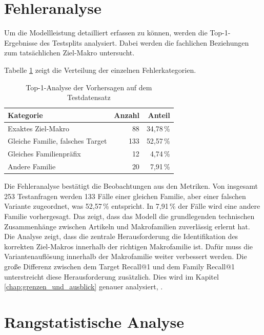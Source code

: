 \section{Fehleranalyse}

Um die Modellleistung detailliert erfassen zu können, werden die Top-1-Ergebnisse des Testsplits analysiert. Dabei werden die fachlichen Beziehungen zum tatsächlichen Ziel-Makro untersucht.

Tabelle \ref{tab:fehleranalyse_top1} zeigt die Verteilung der einzelnen Fehlerkategorien. 

\begin{table}[H] 
  \centering 
  \caption{Top-1-Analyse der Vorhersagen auf dem Testdatensatz} 
  \label{tab:fehleranalyse_top1} 
  \begin{tabular}{lrr} 
    \toprule 
    \textbf{Kategorie} & \textbf{Anzahl} & \textbf{Anteil} \\ 
    \midrule 
    Exaktes Ziel-Makro \parencite{EPLAN-Makros} & 88 & 34,78\,\% \\
    Gleiche Familie, falsches Target & 133 & 52,57\,\% \\
    Gleiches Familienpräfix & 12 & 4,74\,\% \\
    Andere Familie & 20 & 7,91\,\% \\
    \bottomrule 
  \end{tabular} 
\end{table}

Die Fehleranalyse bestätigt die Beobachtungen aus den Metriken. Von insgesamt 253 Testanfragen werden 133 Fälle einer gleichen Familie, aber einer falschen Variante zugeordnet, was 52,57\,\% entspricht.
In 7,91\,\% der Fälle wird eine andere Familie vorhergesagt. Das zeigt, dass das Modell die grundlegenden technischen Zusammenhänge zwischen Artikeln und Makrofamilien zuverlässig erlernt hat.
Die Analyse zeigt, dass die zentrale Herausforderung die Identifikation des korrekten Ziel-Makros \parencite{EPLAN-Makros} innerhalb der richtigen Makrofamilie ist. Dafür muss die Variantenauflösung innerhalb der Makrofamilie weiter verbessert werden.
Die große Differenz zwischen dem Target Recall@1 und dem Family Recall@1 unterstreicht diese Herausforderung zusätzlich.
Dies wird im Kapitel \ref{chap:grenzen_und_ausblick} genauer analysiert, \parencite{LTR_Configuration_Test_Series}.


\section{Rangstatistische Analyse}

